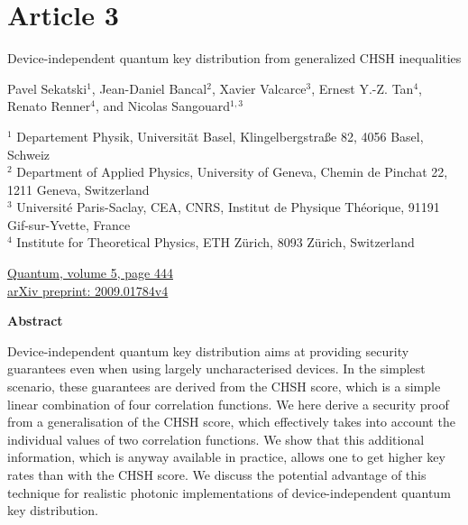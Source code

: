 \chapter*{Article 3}

\begin{center}
\textrm{\LARGE Device-independent quantum key distribution from generalized CHSH inequalities}

\vspace{2cm}

\normalsize
Pavel Sekatski$^{1}$, Jean-Daniel Bancal$^{2}$, Xavier Valcarce$^{3}$, Ernest Y.-Z. Tan$^{4}$, Renato Renner$^{4}$, and Nicolas Sangouard$^{1,3}$
\bigbreak

{\footnotesize
	$^1$ Departement Physik, Universität Basel, Klingelbergstraße 82, 4056 Basel, Schweiz \\
	$^2$ Department of Applied Physics, University of Geneva, Chemin de Pinchat 22, 1211 Geneva, Switzerland \\
	$^3$ Université Paris-Saclay, CEA, CNRS, Institut de Physique Théorique, 91191 Gif-sur-Yvette, France \\
	$^4$ Institute for Theoretical Physics, ETH Zürich, 8093 Zürich, Switzerland
}

\raggedright
\bigbreak
\faLink \quad \href{https://quantum-journal.org/papers/q-2021-04-26-444/}{Quantum, volume 5, page 444} \\
\faLink \quad \href{https://arxiv.org/abs/2009.01784v4}{arXiv preprint: 2009.01784v4}
\vspace{1cm}

\centering
\textbf{Abstract}
\bigbreak

Device-independent quantum key distribution aims at providing security guarantees even when using largely uncharacterised devices.
In the simplest scenario, these guarantees are derived from the CHSH score, which is a simple linear combination of four correlation functions.
We here derive a security proof from a generalisation of the CHSH score, which effectively takes into account the individual values of two correlation functions.
We show that this additional information, which is anyway available in practice, allows one to get higher key rates than with the CHSH score.
We discuss the potential advantage of this technique for realistic photonic implementations of device-independent quantum key distribution.

\end{center}
